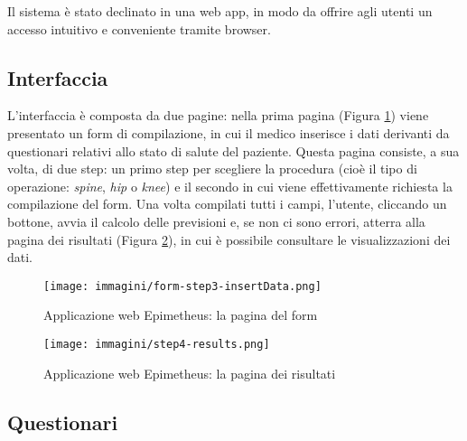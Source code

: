 Il sistema è stato declinato in una web app, in modo da offrire agli utenti un accesso intuitivo e conveniente tramite browser.

\subsection{Interfaccia}
\label{subsec:interfacce}

L'interfaccia è composta da due pagine:
nella prima pagina (Figura \ref{fig:formPage}) viene presentato un form di compilazione, in cui il medico inserisce i dati derivanti da questionari relativi allo stato di salute del paziente. Questa pagina consiste, a sua volta, di due step: un primo step per scegliere la procedura (cioè il tipo di operazione: \textit{spine}, \textit{hip} o \textit{knee}) e il secondo in cui viene effettivamente richiesta la compilazione del form. 
\newline
Una volta compilati tutti i campi, l’utente, cliccando un bottone, avvia il calcolo delle previsioni e, se non ci sono errori, atterra alla pagina dei risultati (Figura \ref{fig:resultsPage}), in cui è possibile consultare le visualizzazioni dei dati.

\begin{figure}
    \centering
    \texttt{[image: immagini/form-step3-insertData.png]}
    \caption{Applicazione web Epimetheus: la pagina del form}
    \label{fig:formPage}
\end{figure}

\begin{figure}
    \centering
    \texttt{[image: immagini/step4-results.png]}
    \caption{Applicazione web Epimetheus: la pagina dei risultati}
    \label{fig:resultsPage}
\end{figure}


\subsection{Questionari}
\label{subsec:questionari}

